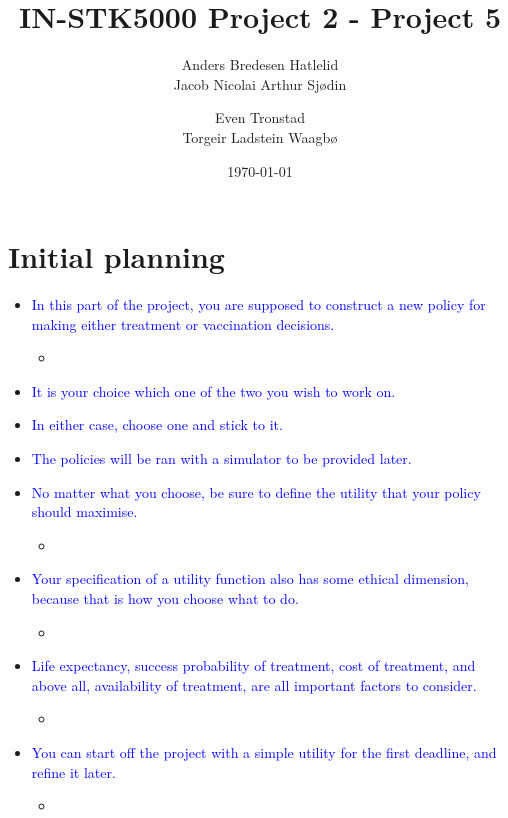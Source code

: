 \documentclass[a4paper, 12pt]{extarticle}
\title{IN-STK5000 Project 2 - Project 5}
\author{Anders Bredesen Hatlelid \\
        Jacob Nicolai Arthur Sjødin \\
        \and
        Even Tronstad \\
        Torgeir Ladstein Waagbø 
}
\date{\today}
\begin{document}
\maketitle


\newpage
\section*{Initial planning}
\begin{itemize}
    \item \textcolor{blue}{In this part of the project, you are supposed to construct a new policy for making either treatment or vaccination decisions.}
        \begin{itemize}
            \item  
        \end{itemize}
    \item \textcolor{blue}{It is your choice which one of the two you wish to work on.}
    \item \textcolor{blue}{In either case, choose one and stick to it.}
    \item \textcolor{blue}{The policies will be ran with a simulator to be provided later.}
    \item \textcolor{blue}{No matter what you choose, be sure to define the utility that your policy should maximise.}
        \begin{itemize}
            \item 
        \end{itemize}
    \item \textcolor{blue}{Your specification of a utility function also has some ethical dimension, because that is how you choose what to do.}
        \begin{itemize}
            \item 
        \end{itemize}
    \item \textcolor{blue}{Life expectancy, success probability of treatment, cost of treatment,  and above all, availability of treatment, are all important factors to consider.}
        \begin{itemize}
            \item 
        \end{itemize}
    \item \textcolor{blue}{You can start off the project with a simple utility for the first deadline, and refine it later.}
        \begin{itemize}
            \item 

\end{itemize}
\end{itemize}
\end{document}
